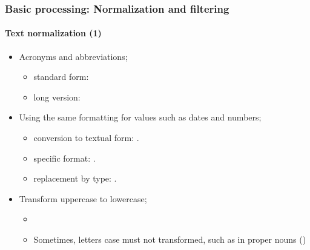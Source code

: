\documentclass[xcolor=table]{beamer}
\begin{document}
\begin{frame}
\frametitle{Basic processing: Normalization and filtering}
\framesubtitle{Text normalization (1)}

\begin{itemize}
	\item Acronyms and abbreviations;
	\begin{itemize}
		\item standard form: 
		\item long version: 
	\end{itemize}
	
	\item Using the same formatting for values such as dates and numbers;
	\begin{itemize}
		\item conversion to textual form: .
		\item specific format: .
		\item replacement by type: .
	\end{itemize}
	
	\item Transform uppercase to lowercase;
	\begin{itemize}
		\item {}
		\item Sometimes, letters case must not transformed, such as in proper nouns ()
	\end{itemize}
\end{itemize}

\end{frame}
\end{document}
